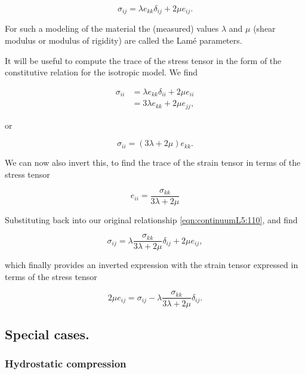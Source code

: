 \begin{equation}\label{eqn:continuumL5:110}
\boxed{
\sigma_{ij} = \lambda e_{kk} \delta_{ij} + 2 \mu e_{ij}.
}
\end{equation}

For such a modeling of the material the (measured) values $\lambda$ and $\mu$ (shear modulus or modulus of rigidity) are called the Lam\'e parameters.

It will be useful to compute the trace of the stress tensor in the form of the constitutive relation for the isotropic model.  We find

\begin{align*}
\sigma_{ii}
&= \lambda e_{kk} \delta_{ii} + 2 \mu e_{ii} \\
&= 3 \lambda e_{kk} + 2 \mu e_{jj},
\end{align*}

or

\begin{equation}\label{eqn:continuumL5:150}
\sigma_{ii} = (3 \lambda + 2 \mu) e_{kk}.
\end{equation}

We can now also invert this, to find the trace of the strain tensor in terms of the stress tensor

\begin{equation}\label{eqn:continuumL5:130}
e_{ii} = \frac{\sigma_{kk}}{3 \lambda + 2 \mu}
\end{equation}

Substituting back into our original relationship \ref{eqn:continuumL5:110}, and find

\begin{equation}\label{eqn:continuumL5:110b}
\sigma_{ij} = \lambda \frac{\sigma_{kk}}{3 \lambda + 2 \mu} \delta_{ij} + 2 \mu e_{ij},
\end{equation}

which finally provides an inverted expression with the strain tensor expressed in terms of the stress tensor

\begin{equation}\label{eqn:continuumL5:110b}
\boxed{
2 \mu e_{ij} =
\sigma_{ij} - \lambda \frac{\sigma_{kk}}{3 \lambda + 2 \mu} \delta_{ij}.
}
\end{equation}

\subsection{Special cases.}
\subsubsection{Hydrostatic compression}

